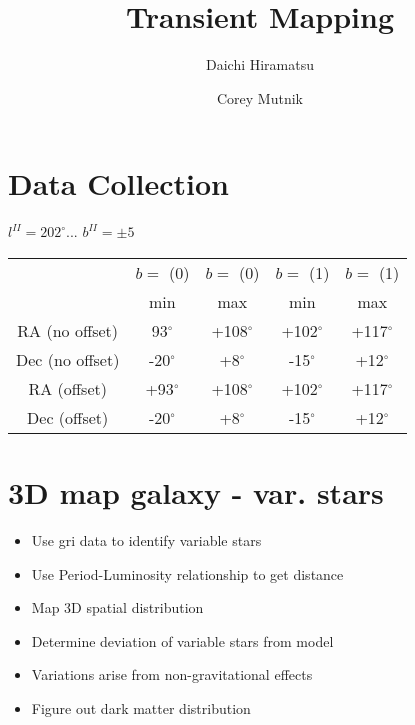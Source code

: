 \documentclass[aps,prl,twocolumn,superscriptaddress]{revtex4-1}
\begin{document}
\title{Transient Mapping}


\author{Daichi Hiramatsu}
\author{Corey Mutnik}



\begin{abstract}

\end{abstract}

\maketitle    


\section{Data Collection}
$l^{II}=202^{\circ}$...
$b^{II}=\pm5$
\begin{table}[H]
	\begin{tabular}{ | c | c | c | c | c | } \hline
		& $b=$ (0) & $b=$ (0) & $b=$ (1) & $b=$ (1) \\
		& min & max & min & max \\ \hline \hline
		RA (no offset) & 93$^{\circ}$ & +108$^{\circ}$ & +102$^{\circ}$ & +117$^{\circ}$  \\ \hline
		Dec (no offset) & -20$^{\circ}$ & +8$^{\circ}$ & -15$^{\circ}$ & +12$^{\circ}$ \\ \hline
		RA (offset) & +93$^{\circ}$ & +108$^{\circ}$ & +102$^{\circ}$ & +117$^{\circ}$ \\ \hline
		Dec (offset) & -20$^{\circ}$ & +8$^{\circ}$ & -15$^{\circ}$ & +12$^{\circ}$ \\ \hline
	\end{tabular}
\end{table}


\section{3D map galaxy - var. stars}

\begin{itemize}
	\item{} Use gri data to identify variable stars
	\item{} Use Period-Luminosity relationship to get distance
	\item{} Map 3D spatial distribution
	\item{} Determine deviation of variable stars from model
	\item{} Variations arise from non-gravitational effects
	\item{} Figure out dark matter distribution
\end{itemize}
\end{document}
